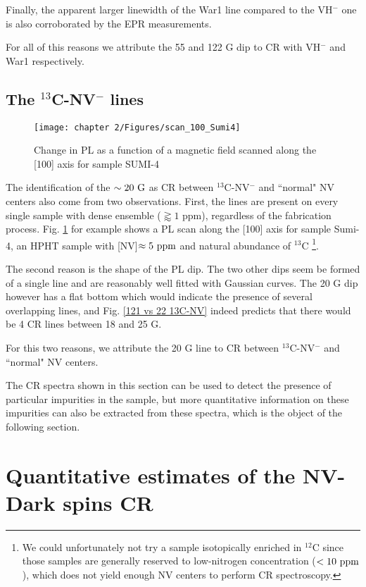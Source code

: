 \documentclass[a4paper, 11pt]{report}
\begin{document}
Finally, the apparent larger linewidth of the War1 line compared to the VH$^-$ one is also corroborated by the EPR measurements.

For all of this reasons we attribute the 55 and 122 G dip to CR with VH$^-$ and War1 respectively.

\subsection{The $^{13}$C-NV$^-$ lines}

\begin{figure}[h]
\centering
\texttt{[image: chapter 2/Figures/scan\_100\_Sumi4]}
\caption{Change in PL as a function of a magnetic field scanned along the [100] axis for sample SUMI-4}
\label{scan sumi 4}
\end{figure}

The identification of the $\sim 20\ \rm G$ as CR between $^{13}$C-NV$^-$ and ``normal" NV centers also come from two observations. First, the lines are present on every single sample with dense ensemble ($\gtrapprox 1$ ppm), regardless of the fabrication process. Fig. \ref{scan sumi 4} for example shows a PL scan along the [100] axis for sample Sumi-4, an HPHT sample with [NV]$\approx 5\ \rm ppm$ and natural abundance of $^{13}$C \footnote{We could unfortunately not try a sample isotopically enriched in $^{12}$C since those samples are generally reserved to low-nitrogen concentration ($< 10\ \rm ppm$), which does not yield enough NV centers to perform CR spectroscopy. }. 

The second reason is the shape of the PL dip. The two other dips seem be formed of a single line and are reasonably well fitted with Gaussian curves. The 20 G dip however has a flat bottom which would indicate the presence of several overlapping lines, and Fig. \ref{121 vs 22 13C-NV} indeed predicts that there would be 4 CR lines between 18 and 25 G.

For this two reasons, we attribute the 20 G line to CR between $^{13}$C-NV$^-$ and ``normal" NV centers.

\bigskip

The CR spectra shown in this section can be used to detect the presence of particular impurities in the sample, but more quantitative information on these impurities can also be extracted from these spectra, which is the object of the following section.

\section{Quantitative estimates of the NV-Dark spins CR}
\end{document}
